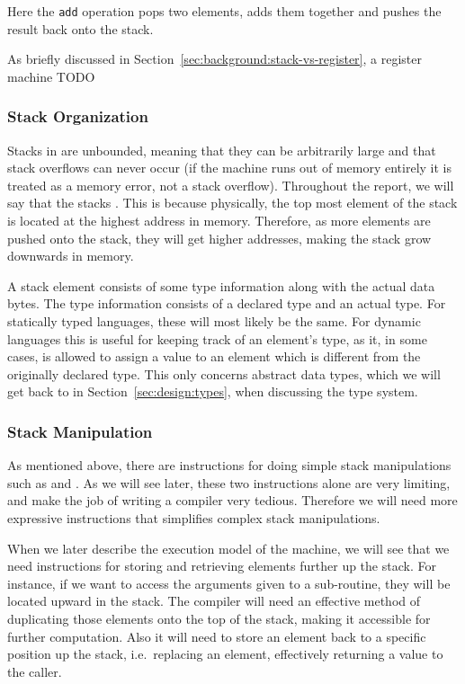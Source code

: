 Here the {\tt add} operation pops two elements, adds them together and pushes
the result back onto the stack.

As briefly discussed in Section~\ref{sec:background:stack-vs-register}, a
register machine TODO %

\subsubsection{Stack Organization}

Stacks in \thename{} are unbounded, meaning that they can be arbitrarily large
and that stack overflows can never occur (if the machine runs out of memory
entirely it is treated as a memory error, not a stack overflow). Throughout the
report, we will say that the stacks . This is because
physically, the top most element of the stack is located at the highest address
in memory. Therefore, as more elements are pushed onto the stack, they will get
higher addresses, making the stack grow downwards in memory.

A stack element consists of some type information along with the actual data
bytes. The type information consists of a declared type and an actual type. For
statically typed languages, these will most likely be the same. For dynamic
languages this is useful for keeping track of an element's type, as it, in some
cases, is allowed to assign a value to an element which is different from the
originally declared type. This only concerns abstract data types, which we will
get back to in Section~\ref{sec:design:types}, when discussing the type system.

\subsubsection{Stack Manipulation}

As mentioned above, there are instructions for doing simple stack manipulations
such as  and . As we will see later, these two instructions
alone are very limiting, and make the job of writing a compiler very
tedious. Therefore we will need more expressive instructions that simplifies
complex stack manipulations.

When we later describe the execution model of the machine, we will see that we
need instructions for storing and retrieving elements further up the stack. For
instance, if we want to access the arguments given to a sub-routine, they will
be located upward in the stack. The compiler will need an effective method of
duplicating those elements onto the top of the stack, making it accessible for
further computation. Also it will need to store an element back to a specific
position up the stack, i.e.~replacing an element, effectively returning a value
to the caller.

